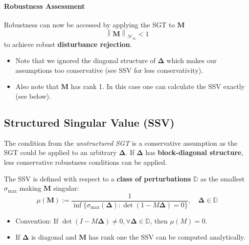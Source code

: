 \paragraph{Robustness Assessment}
Robustness can now be accessed by applying the SGT to $\mathbf{M}$
\begin{equation*}
    \left\|\mathbf{M}\right\|_{\mathcal{H}_\infty}<1
\end{equation*}
to achieve robust \textbf{disturbance rejection}.

\newpar{}
\begin{itemize}
    \item Note that we ignored the diagonal structure of $\boldsymbol{\Delta}$ which makes our assumptions too conservative (see SSV for less conservativity).
    \item Also note that $\mathbf{M}$ has rank 1. In this case one can calculate the SSV exactly (see below).
\end{itemize}

\subsection{Structured Singular Value (SSV)}
The condition from the \textit{unstructured SGT} is a conservative assumption as the SGT could be applied to an arbitrary $\boldsymbol{\Delta}$.
If $\boldsymbol{\Delta}$ has \textbf{block-diagonal structure}, less conservative robustness conditions can be applied.

\newpar{}

The SSV is defined with respect to a \textbf{class of perturbations} $\mathbb{D}$ as the smallest $\sigma_{\max}$ making $\mathbf{M}$ singular:
\begin{equation*}
    \mu(\mathbf{M}):=\frac1{\inf\{\sigma_{\max}(\boldsymbol{\Delta}):\det(1-M\boldsymbol{\Delta})=0\}},\quad\boldsymbol{\Delta}\in\mathbb{D}
\end{equation*}
\begin{itemize}
    \item Convention: If $\det(I-M\boldsymbol{\Delta})\neq0,\forall\boldsymbol{\Delta}\in\mathbb{D}\text{, then }\mu(M)=0$.
    \item If $\boldsymbol{\Delta}$ is diagonal and $\mathbf{M}$ has rank one the SSV can be computed analytically.
\end{itemize}

